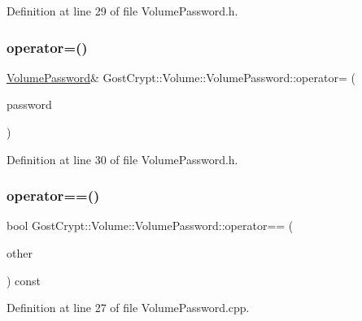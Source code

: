 Definition at line 29 of file Volume\+Password.\+h.

\mbox{\label{class_gost_crypt_1_1_volume_1_1_volume_password_acfae7086a762660313e259117aa90d4d}} 
\subsubsection{\texorpdfstring{operator=()}{operator=()}}
{\footnotesize\ttfamily \hyperlink{class_gost_crypt_1_1_volume_1_1_volume_password}{Volume\+Password}\& Gost\+Crypt\+::\+Volume\+::\+Volume\+Password\+::operator= (\begin{DoxyParamCaption}\item[{const \hyperlink{class_gost_crypt_1_1_volume_1_1_volume_password}{Volume\+Password} \&}]{password }\end{DoxyParamCaption})\hspace{0.3cm}{\ttfamily [inline]}}



Definition at line 30 of file Volume\+Password.\+h.

\mbox{\label{class_gost_crypt_1_1_volume_1_1_volume_password_a23b802f513c0af399a7012f419e44be6}} 
\subsubsection{\texorpdfstring{operator==()}{operator==()}}
{\footnotesize\ttfamily bool Gost\+Crypt\+::\+Volume\+::\+Volume\+Password\+::operator== (\begin{DoxyParamCaption}\item[{const \hyperlink{class_gost_crypt_1_1_volume_1_1_volume_password}{Volume\+Password} \&}]{other }\end{DoxyParamCaption}) const}



Definition at line 27 of file Volume\+Password.\+cpp.

